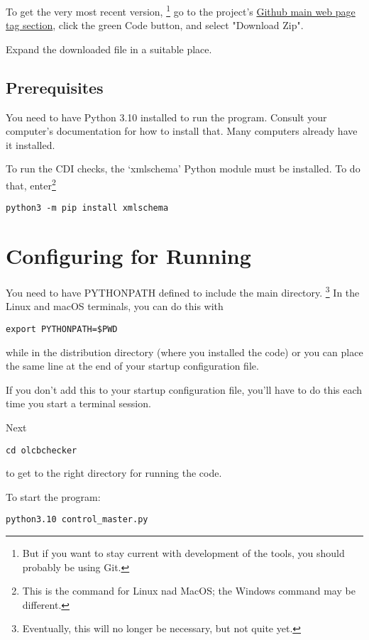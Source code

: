 \documentclass[11pt]{article}
\begin{document}
To get the very most recent version,
\footnote{But if you want to stay current with development of the tools, you should probably be using Git.}
go to the project's
\href{https://github.com/bobjacobsen/PythonOlcbNode}{Github main web page tag section},
click the green Code button, and select "Download Zip".

Expand the downloaded file in a suitable place.

\subsection{Prerequisites}

You need to have Python 3.10 installed to run the program. Consult your
computer's documentation for how to install that.  Many computers already
have it installed.

To run the CDI checks, the `xmlschema' Python module must be installed. To do that, 
enter\footnote{This is the command for Linux nad MacOS; the Windows command may be different.}

\begin{verbatim}
python3 -m pip install xmlschema
\end{verbatim}

\section{Configuring for Running}

You need to have PYTHONPATH defined to include the main directory.
\footnote{Eventually, this will no longer be necessary, but not quite yet.}
In the Linux and macOS
terminals, you can do this with

\begin{verbatim}
export PYTHONPATH=$PWD
\end{verbatim}
while in the distribution directory (where you installed the code)
or you can place the same line at the end of your startup configuration file.

If you don't add this to your startup configuration file, you'll have to do 
this each time you start a terminal session.

Next
\begin{verbatim}
cd olcbchecker
\end{verbatim}
to get to the right directory for running the code. 

To start the program:
\begin{verbatim}
python3.10 control_master.py
\end{verbatim}
\end{document}
